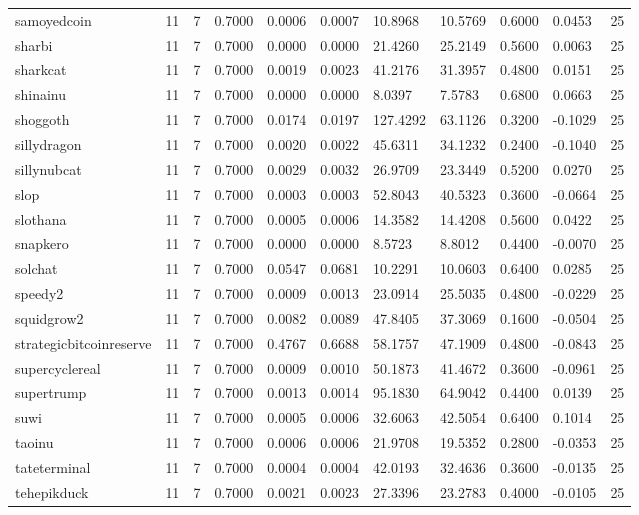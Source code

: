 \begin{table}[htbp]
\begin{tabular}{lllllllllll}
samoyedcoin & 11 & 7 & 0.7000 & 0.0006 & 0.0007 & 10.8968 & 10.5769 & 0.6000 & 0.0453 & 25 \\
sharbi & 11 & 7 & 0.7000 & 0.0000 & 0.0000 & 21.4260 & 25.2149 & 0.5600 & 0.0063 & 25 \\
sharkcat & 11 & 7 & 0.7000 & 0.0019 & 0.0023 & 41.2176 & 31.3957 & 0.4800 & 0.0151 & 25 \\
shinainu & 11 & 7 & 0.7000 & 0.0000 & 0.0000 & 8.0397 & 7.5783 & 0.6800 & 0.0663 & 25 \\
shoggoth & 11 & 7 & 0.7000 & 0.0174 & 0.0197 & 127.4292 & 63.1126 & 0.3200 & -0.1029 & 25 \\
sillydragon & 11 & 7 & 0.7000 & 0.0020 & 0.0022 & 45.6311 & 34.1232 & 0.2400 & -0.1040 & 25 \\
sillynubcat & 11 & 7 & 0.7000 & 0.0029 & 0.0032 & 26.9709 & 23.3449 & 0.5200 & 0.0270 & 25 \\
slop & 11 & 7 & 0.7000 & 0.0003 & 0.0003 & 52.8043 & 40.5323 & 0.3600 & -0.0664 & 25 \\
slothana & 11 & 7 & 0.7000 & 0.0005 & 0.0006 & 14.3582 & 14.4208 & 0.5600 & 0.0422 & 25 \\
snapkero & 11 & 7 & 0.7000 & 0.0000 & 0.0000 & 8.5723 & 8.8012 & 0.4400 & -0.0070 & 25 \\
solchat & 11 & 7 & 0.7000 & 0.0547 & 0.0681 & 10.2291 & 10.0603 & 0.6400 & 0.0285 & 25 \\
speedy2 & 11 & 7 & 0.7000 & 0.0009 & 0.0013 & 23.0914 & 25.5035 & 0.4800 & -0.0229 & 25 \\
squidgrow2 & 11 & 7 & 0.7000 & 0.0082 & 0.0089 & 47.8405 & 37.3069 & 0.1600 & -0.0504 & 25 \\
strategicbitcoinreserve & 11 & 7 & 0.7000 & 0.4767 & 0.6688 & 58.1757 & 47.1909 & 0.4800 & -0.0843 & 25 \\
supercyclereal & 11 & 7 & 0.7000 & 0.0009 & 0.0010 & 50.1873 & 41.4672 & 0.3600 & -0.0961 & 25 \\
supertrump & 11 & 7 & 0.7000 & 0.0013 & 0.0014 & 95.1830 & 64.9042 & 0.4400 & 0.0139 & 25 \\
suwi & 11 & 7 & 0.7000 & 0.0005 & 0.0006 & 32.6063 & 42.5054 & 0.6400 & 0.1014 & 25 \\
taoinu & 11 & 7 & 0.7000 & 0.0006 & 0.0006 & 21.9708 & 19.5352 & 0.2800 & -0.0353 & 25 \\
tateterminal & 11 & 7 & 0.7000 & 0.0004 & 0.0004 & 42.0193 & 32.4636 & 0.3600 & -0.0135 & 25 \\
tehepikduck & 11 & 7 & 0.7000 & 0.0021 & 0.0023 & 27.3396 & 23.2783 & 0.4000 & -0.0105 & 25 \\

\end{tabular}
\end{table}
